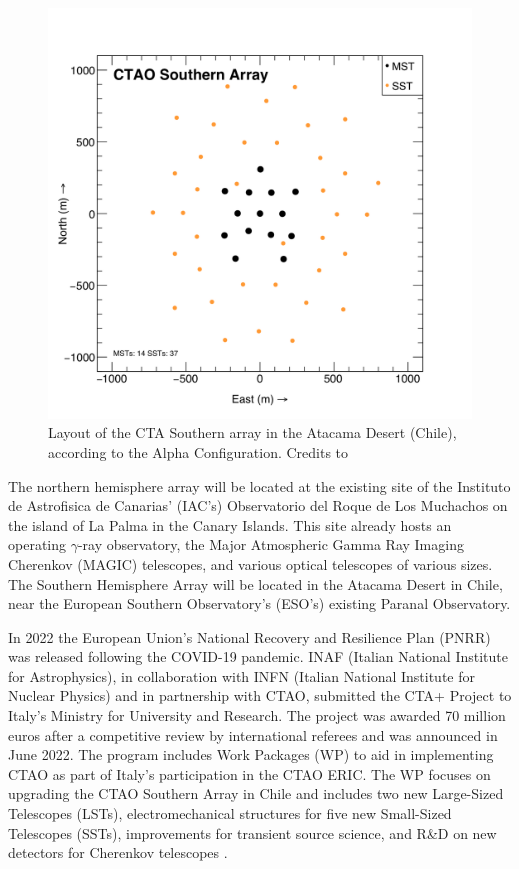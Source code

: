 \begin{figure}[ht]
\centering
\includegraphics[width=0.8\linewidth]{figures/introduction/ctao-south.png}
\caption{Layout of the CTA Southern array in the Atacama Desert (Chile), according to the Alpha Configuration. Credits to \cite{zenodo_2021}}
\label{fig:ctao-south}
\end{figure}
The northern hemisphere array will be located at the existing site of the Instituto de Astrofisica de Canarias' (IAC's) Observatorio del Roque de Los Muchachos on the island of La Palma in the Canary Islands. This site already hosts an operating $\gamma$-ray observatory, the Major Atmospheric Gamma Ray Imaging Cherenkov (MAGIC) telescopes, and various optical telescopes of various sizes. The Southern Hemisphere Array will be located in the Atacama Desert in Chile, near the European Southern Observatory's (ESO's) existing Paranal Observatory. 

In 2022 the European Union's National Recovery and Resilience Plan (PNRR) was released following the COVID-19 pandemic. INAF (Italian National Institute for Astrophysics), in collaboration with INFN (Italian National Institute for Nuclear Physics) and in partnership with CTAO, submitted the CTA+ Project to Italy's Ministry for University and Research. The project was awarded 70 million euros after a competitive review by international referees and was announced in June 2022.
The program includes Work Packages (WP) to aid in implementing CTAO as part of Italy's participation in the CTAO ERIC. The WP focuses on upgrading the CTAO Southern Array in Chile and includes two new Large-Sized Telescopes (LSTs), electromechanical structures for five new Small-Sized Telescopes (SSTs), improvements for transient source science, and R\&D on new detectors for Cherenkov telescopes \cite{ctaobservatorywebsite}.

